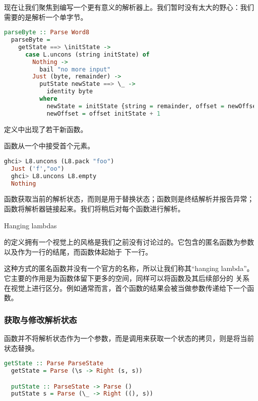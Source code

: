 \documentclass[./main.tex]{subfiles}
\begin{document}
现在让我们聚焦到编写一个更有意义的解析器上。我们暂时没有太大的野心：我们需要的是解析一个单字节。

\begin{lstlisting}[language=Haskell]
  parseByte :: Parse Word8
  parseByte =
    getState ==> \initState ->
      case L.uncons (string initState) of
        Nothing ->
          bail "no more input"
        Just (byte, remainder) ->
          putState newState ==> \_ ->
            identity byte
          where
            newState = initState {string = remainder, offset = newOffset}
            newOffset = offset initState + 1
\end{lstlisting}

定义中出现了若干新函数。

函数从一个中接受首个元素。

\begin{lstlisting}[language=Haskell]
  ghci> L8.uncons (L8.pack "foo")
  Just ('f',"oo")
  ghci> L8.uncons L8.empty
  Nothing
\end{lstlisting}

函数获取当前的解析状态，而则是用于替换状态；函数则是终结解析并报告异常；\acode{(==>)}
函数将解析器链接起来。我们将稍后对每个函数进行解析。

\begin{anote}
  Hanging lambdas

  的定义拥有一个视觉上的风格是我们之前没有讨论过的。它包含的匿名函数为参数以及\acode{->}作为一行的结尾，而函数体起始于
  下一行。

  这种方式的匿名函数并没有一个官方的名称，所以让我们称其“hanging lambda”。它主要的作用是为函数体留下更多的空间，同样可以将函数及其后续部分的
  关系在视觉上进行区分。例如通常而言，首个函数的结果会被当做参数传递给下一个函数。
\end{anote}

\subsubsection*{获取与修改解析状态}

函数并不将解析状态作为一个参数，而是调用来获取一个状态的拷贝，则是将当前状态替换。

\begin{lstlisting}[language=Haskell]
  getState :: Parse ParseState
  getState = Parse (\s -> Right (s, s))

  putState :: ParseState -> Parse ()
  putState s = Parse (\_ -> Right ((), s))
\end{lstlisting}
\end{document}
